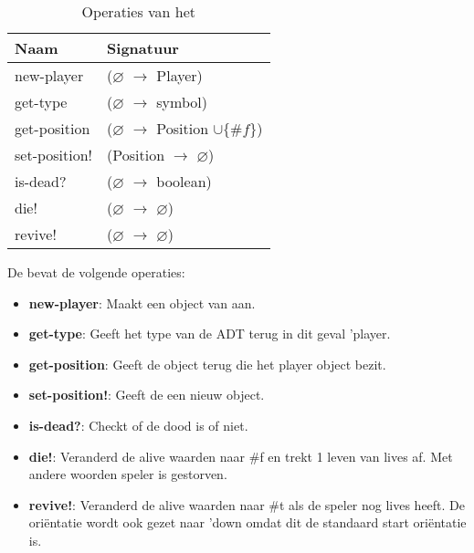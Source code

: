\begin{table}[hbt]
\centering
\begin{tabular}{|ll|}
\hline
\rowcolor[HTML]{000000} 
{\color[HTML]{FFFFFF} \textbf{Naam}} & {\color[HTML]{FFFFFF} \textbf{Signatuur}} \\ \hline
new-player    & ($\varnothing$ $\rightarrow$ Player) \\ \hline
get-type      & ($\varnothing$ $\rightarrow$ symbol)                        \\ \hline
get-position  & ($\varnothing$ $\rightarrow$ Position $\cup\{\#f\}$)                        \\ \hline
set-position! & (Position $\rightarrow$ $\varnothing$)                        \\ \hline
is-dead?      & ($\varnothing$ $\rightarrow$ boolean)               \\ \hline
die!          & ($\varnothing$ $\rightarrow$ $\varnothing$)                   \\ \hline
revive!       & ($\varnothing$ $\rightarrow$ $\varnothing$)                   \\ \hline
\end{tabular}
\caption{Operaties van het \texttt{}}
\label{table:ant}
\end{table}

De \texttt{} bevat de volgende operaties:

\begin{itemize}
	\item \textbf{new-player}: Maakt een object van \texttt{} aan.
	\item \textbf{get-type}: Geeft het type van de ADT terug in dit geval 'player.
	\item \textbf{get-position}: Geeft de \texttt{} object terug die het player object bezit.
	\item \textbf{set-position!}: Geeft de \texttt{} een nieuw \texttt{} object.
	\item \textbf{is-dead?}: Checkt of de \texttt{} dood is of niet.
	\item \textbf{die!}: Veranderd de alive waarden naar \#f
		en trekt 1 leven van lives af.
		Met andere woorden speler is gestorven.
	\item \textbf{revive!}: Veranderd de alive waarden naar \#t als de speler nog lives heeft.
		De oriëntatie wordt ook gezet naar 'down omdat dit de standaard start oriëntatie is.
\end{itemize}

